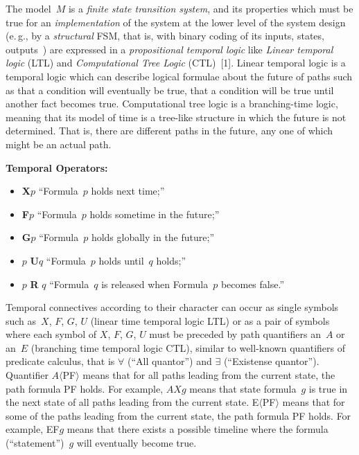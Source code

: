 \begin{multicols}{2}
The model~$M$ is a \textit{finite state transition system}, and its properties which must be true for 
an \textit{implementation} of the system at the lower level of the system design (e.\,g., by a 
\textit{structural} FSM, that is, with binary coding of its inputs, states, outputs~\cite{1fr}) are expressed 
in a \textit{propositional temporal logic} like \textit{Linear temporal logic} (LTL) and 
\textit{Computational Tree Logic} (CTL)~[1]. Linear temporal logic is a temporal logic which can describe logical 
formulae about the future of paths such as that a condition will eventually be true, that a condition 
will be true until another fact becomes true. Computational tree logic is a branching-time logic, meaning that its 
model of time is a tree-like structure in which the future is not determined. That is, there are 
different paths in the future, any one of which might be an actual path. 

\textbf{Temporal Operators:}
\begin{itemize}
\item
\textbf{X}$p$ ``Formula~$p$ holds next time;''
\item
\textbf{F}$p$ ``Formula~$p$ holds sometime in the future;''
\item
\textbf{G}$p$ ``Formula~$p$ holds globally in the future;''
\item
$p$ \textbf{U}$q$ ``Formula~$p$ holds until~$q$ holds;''
\item
$p$ \textbf{R} $q$ ``Formula~$q$ is released when Formula~$p$ becomes false.''
\end{itemize}

Temporal connectives according to their character can occur as single symbols such as~$X$, $F$, $G$, $U$ 
(linear time temporal logic LTL) or as a pair of symbols where each symbol of $X$, $F$, $G$, $U$  must 
be preceded by path quantifiers an~$A$ or an~$E$ (branching time temporal logic CTL), similar to well-known quantifiers of predicate calculus, that is $\forall$ 
(``All quantor'') and $\exists$ (``Existense quantor''). Quantifier $A\langle$PF$\rangle$ means 
that for all paths leading from the current state, the path formula PF holds. For example, $AXg$ 
means that state formula~$g$ is true in the next state of all paths leading from the current state. 
E$\langle$PF$\rangle$ means that for some of the paths leading from the current state, the path 
formula PF holds. For example, EF$g$ means that there exists a possible timeline where the 
formula (``statement'')~$g$ will eventually become true.


\end{multicols}
